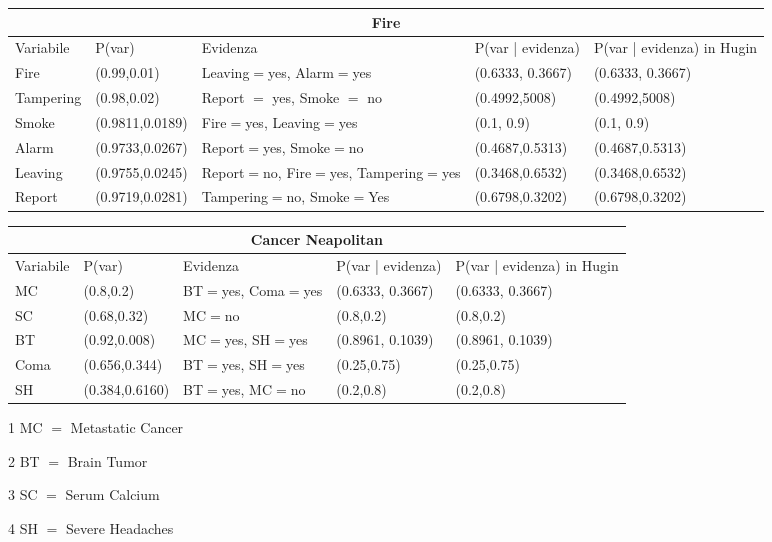 \documentclass{report}
\begin{document}
\begin{table}[hbt!]
\small

\hskip-1.0cm\begin{tabular}{ |p{2cm}|p{2cm}|p{2cm}|p{3cm}|p{3cm}|  }
\hline
 \multicolumn{5}{|c|}{Fire} \\
 \hline
Variabile & P(var) & Evidenza & P(var | evidenza) & P(var | evidenza)  in Hugin\\
 \hline
Fire &(0.99,0.01) & Leaving$=$yes, Alarm$=$yes & (0.6333, 0.3667) &(0.6333, 0.3667)\\
\hline
Tampering & (0.98,0.02) & Report $=$ yes, Smoke $=$ no & (0.4992,5008)&  (0.4992,5008)\\
\hline
Smoke & (0.9811,0.0189) & Fire$=$yes, Leaving$=$yes & (0.1, 0.9) & (0.1, 0.9)\\
\hline
Alarm & (0.9733,0.0267) & Report$=$yes, Smoke$=$no & (0.4687,0.5313) & (0.4687,0.5313)\\
\hline
Leaving & (0.9755,0.0245) & \makecell[l]{Report$=$no, \\ Fire$=$yes, \\Tampering$=$yes} & (0.3468,0.6532) & (0.3468,0.6532)\\
\hline
Report & (0.9719,0.0281)&Tampering$=$no, Smoke$=$Yes & (0.6798,0.3202) & (0.6798,0.3202)\\
\hline
\end{tabular}
\newline
\vspace*{0.5 cm}
\newline

\hskip-1.0cm\begin{threeparttable}
\begin{tabular}{ |p{2cm}|p{2cm}|p{2cm}|p{3cm}|p{3cm}|  }
\hline
 \multicolumn{5}{|c|}{Cancer Neapolitan} \\
 \hline
Variabile & P(var) & Evidenza & P(var | evidenza) & P(var | evidenza)  in Hugin\\
 \hline
MC &(0.8,0.2) & \makecell[l]{BT$=$yes, \\Coma$=$yes} & (0.6333, 0.3667) &(0.6333, 0.3667)\\
\hline
SC & (0.68,0.32) & MC$=$no & (0.8,0.2)&  (0.8,0.2)\\
\hline
BT & (0.92,0.008) & MC$=$yes, SH$=$yes & (0.8961, 0.1039) & (0.8961, 0.1039)\\
\hline
Coma & (0.656,0.344) & BT$=$yes, SH$=$yes & (0.25,0.75) & (0.25,0.75)\\
\hline
SH & (0.384,0.6160) & BT$=$yes, MC$=$no & (0.2,0.8) &(0.2,0.8)\\
\hline
\end{tabular}
\begin{tablenotes}
 	    \item[1] MC $=$ Metastatic Cancer
        \item[2] BT $=$ Brain Tumor
        \item[3] SC $=$ Serum Calcium
        \item[4] SH $=$ Severe Headaches
 \end{tablenotes}
\end{threeparttable}
\end{table}
\end{document}
